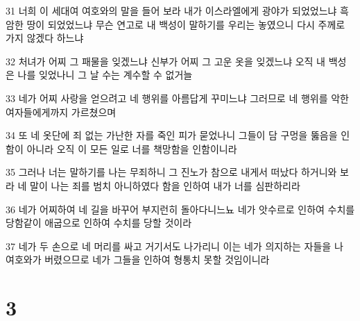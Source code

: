 \par 31 너희 이 세대여 여호와의 말을 들어 보라 내가 이스라엘에게 광야가 되었었느냐 흑암한 땅이 되었었느냐 무슨 연고로 내 백성이 말하기를 우리는 놓였으니 다시 주께로 가지 않겠다 하느냐
\par 32 처녀가 어찌 그 패물을 잊겠느냐 신부가 어찌 그 고운 옷을 잊겠느냐 오직 내 백성은 나를 잊었나니 그 날 수는 계수할 수 없거늘
\par 33 네가 어찌 사랑을 얻으려고 네 행위를 아름답게 꾸미느냐 그러므로 네 행위를 악한 여자들에게까지 가르쳤으며
\par 34 또 네 옷단에 죄 없는 가난한 자를 죽인 피가 묻었나니 그들이 담 구멍을 뚫음을 인함이 아니라 오직 이 모든 일로 너를 책망함을 인함이니라
\par 35 그러나 너는 말하기를 나는 무죄하니 그 진노가 참으로 내게서 떠났다 하거니와 보라 네 말이 나는 죄를 범치 아니하였다 함을 인하여 내가 너를 심판하리라
\par 36 네가 어찌하여 네 길을 바꾸어 부지런히 돌아다니느뇨 네가 앗수르로 인하여 수치를 당함같이 애굽으로 인하여 수치를 당할 것이라
\par 37 네가 두 손으로 네 머리를 싸고 거기서도 나가리니 이는 네가 의지하는 자들을 나 여호와가 버렸으므로 네가 그들을 인하여 형통치 못할 것임이니라

\chapter{3}

